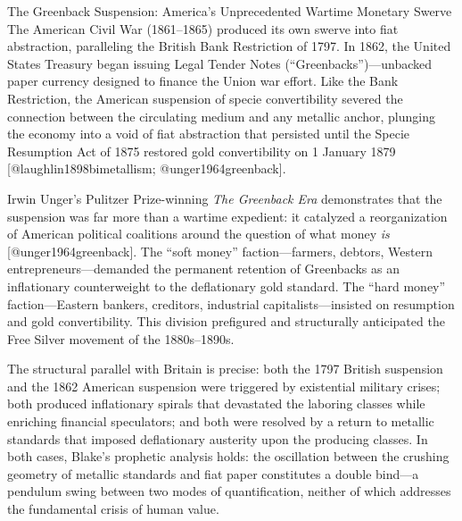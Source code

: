 \documentclass[
  ignorenonframetext,
]{beamer}
\begin{document}
\begin{frame}{The Greenback Suspension: America's Unprecedented Wartime
Monetary Swerve}
\protect{}\label{the-greenback-suspension-americas-unprecedented-wartime-monetary-swerve}
The American Civil War (1861--1865) produced its own swerve into fiat
abstraction, paralleling the British Bank Restriction of 1797. In 1862,
the United States Treasury began issuing Legal Tender Notes
(``Greenbacks'')---unbacked paper currency designed to finance the Union
war effort. Like the Bank Restriction, the American suspension of specie
convertibility severed the connection between the circulating medium and
any metallic anchor, plunging the economy into a void of fiat
abstraction that persisted until the Specie Resumption Act of 1875
restored gold convertibility on 1 January 1879
{[}@laughlin1898bimetallism; @unger1964greenback{]}.

Irwin Unger's Pulitzer Prize-winning \emph{The Greenback Era}
demonstrates that the suspension was far more than a wartime expedient:
it catalyzed a reorganization of American political coalitions around
the question of what money \emph{is} {[}@unger1964greenback{]}. The
``soft money'' faction---farmers, debtors, Western
entrepreneurs---demanded the permanent retention of Greenbacks as an
inflationary counterweight to the deflationary gold standard. The ``hard
money'' faction---Eastern bankers, creditors, industrial
capitalists---insisted on resumption and gold convertibility. This
division prefigured and structurally anticipated the Free Silver
movement of the 1880s--1890s.

The structural parallel with Britain is precise: both the 1797 British
suspension and the 1862 American suspension were triggered by
existential military crises; both produced inflationary spirals that
devastated the laboring classes while enriching financial speculators;
and both were resolved by a return to metallic standards that imposed
deflationary austerity upon the producing classes. In both cases,
Blake's prophetic analysis holds: the oscillation between the crushing
geometry of metallic standards and fiat paper constitutes a double
bind---a pendulum swing between two modes of quantification, neither of
which addresses the fundamental crisis of human value.
\end{frame}
\end{document}
